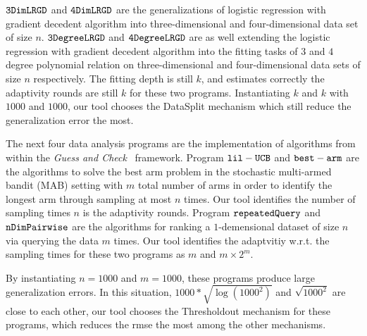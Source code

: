 $  \mathtt{ 3DimLRGD }$ and $  \mathtt{ 4DimLRGD }$ are the generalizations of logistic regression with gradient decedent
algorithm into three-dimensional and four-dimensional data set of size $n$.
$  \mathtt{ 3DegreeLRGD }$ and $  \mathtt{ 4DegreeLRGD }$ are as well extending the logistic regression with gradient decedent
algorithm into the fitting tasks of $3$ and $4$ degree polynomial relation on three-dimensional and four-dimensional data sets of size $n$ respectively.
The fitting depth is still $k$, and {\THESYSTEM} estimates correctly the adaptivity rounds are still $k$ for these two programs.
Instantiating $k$ and $k$ with $1000$ and $1000$,
our tool chooses the DataSplit mechanism which still reduce the generalization error the most.

The next four data analysis programs are the implementation of algorithms from~\cite{Jamieson2015TheAO} within the \emph{Guess and Check}~\cite{RogersRSSTW20} framework.
Program $\mathtt{lil-UCB}$ and $\mathtt{best-arm}$ are the algorithms to solve the best arm problem in the stochastic multi-armed bandit (MAB) setting
with $m$ total number of arms in order to identify the longest arm through sampling at most $n$ times.
Our tool identifies the number of sampling times $n$ is the adaptivity rounds.
Program $\mathtt{repeatedQuery}$ and $\mathtt{nDimPairwise}$ are the algorithms for ranking
a $1$-demensional dataset of size $n$ via querying the data $m$ times.
Our tool identifies the adaptvitiy w.r.t. the sampling times for these two programs as $m$ and $m \times 2^m$.


By instantiating $n = 1000$ and $m = 1000$, these programs produce large generalization errors.
In this situation, $1000* \sqrt{\log(1000^2)}$ and $\sqrt{1000^2}$ are close to each other,
our tool chooses the Thresholdout mechanism for these programs, which reduces the rmse the most
among the other mechanisms.


